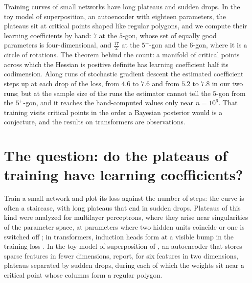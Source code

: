 \newcommand{\stagesH}{H}
\newcommand{\stagesphi}{\phi}

\begin{refsection}

\begin{chaptersummary}
Training curves of small networks have long plateaus and sudden drops. In the toy model of superposition, an autoencoder with eighteen parameters, the plateaus sit at critical points shaped like regular polygons, and we compute their learning coefficients by hand: $7$ at the $5$-gon, whose set of equally good parameters is four-dimensional, and $\frac{17}2$ at the $5^+$-gon and the $6$-gon, where it is a circle of rotations. The theorem behind the count: a manifold of critical points across which the Hessian is positive definite has learning coefficient half its codimension. Along runs of stochastic gradient descent the estimated coefficient steps up at each drop of the loss, from $4.6$ to $7.6$ and from $5.2$ to $7.8$ in our two runs; but at the sample size of the runs the estimator cannot tell the $5$-gon from the $5^+$-gon, and it reaches the hand-computed values only near $n=10^6$. That training visits critical points in the order a Bayesian posterior would is a conjecture, and the results on transformers are observations.
\end{chaptersummary}

\section{The question: do the plateaus of training have learning coefficients?}\label{sec:stages:question}

Train a small network and plot its loss against the number of steps: the curve is often a staircase, with long plateaus that end in sudden drops. Plateaus of this kind were analyzed for multilayer perceptrons, where they arise near singularities of the parameter space, at parameters where two hidden units coincide or one is switched off \parencite{FukumizuAmari2000,AmariEtAl2006}; in transformers, induction heads form at a visible bump in the training loss \parencite{OlssonEtAl2022}. In the toy model of superposition of \textcite{ElhageEtAl2022}, an autoencoder that stores sparse features in fewer dimensions, \textcite{ChenEtAl2023} report, for six features in two dimensions, plateaus separated by sudden drops, during each of which the weights sit near a critical point whose columns form a regular polygon.


\end{refsection}

